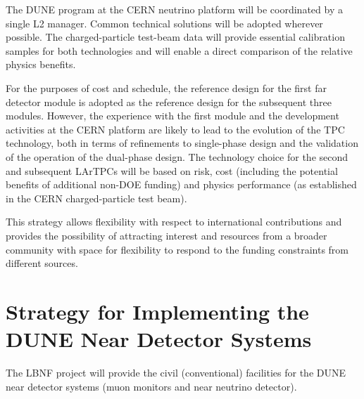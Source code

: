The DUNE program at the CERN neutrino platform will be coordinated by
a single L2 manager. Common technical solutions will be adopted
wherever possible.  The charged-particle test-beam data will provide
essential calibration samples for both technologies and will enable a
direct comparison of the relative physics benefits.

For the purposes of cost and schedule, the reference design for the
first far detector module is adopted as the reference design for the subsequent
three modules. However, the experience with the first 
module and the development activities at the CERN platform are likely
to lead to the evolution of the TPC technology, both in terms of
refinements to single-phase design and the validation of the operation
of the dual-phase design.  The technology choice for the second and
subsequent LArTPCs will be based on risk, cost (including the
potential benefits of additional non-DOE funding) and physics
performance (as established in the CERN charged-particle test beam).

This strategy allows flexibility with respect to international
contributions and provides the possibility of attracting interest and
resources from a broader community with space for flexibility to
respond to the funding constraints from different sources. 

\section{Strategy for Implementing the DUNE Near Detector Systems}

The LBNF project will provide the civil (conventional) facilities for the DUNE near
detector systems (muon monitors and near neutrino detector). 

